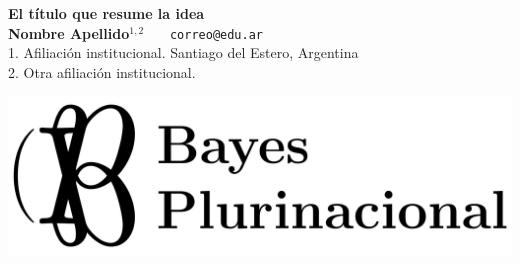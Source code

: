 \documentclass[a0,portrait]{a0poster} %
\begin{document}
\centering \fontsize{90}{90} \textbf{El título que resume la idea} \\[0.5cm]  %
\LARGE \textbf{Nombre Apellido}$^{1,2}$  \ \ \  \texttt{correo@edu.ar} \\
\large 1. Afiliación institucional. Santiago del Estero, Argentina \\
\large 2. Otra afiliación institucional.\\


\vspace{1cm}

\includegraphics[width=0.4\linewidth]{figuras/BP.png} \\
\end{document}
